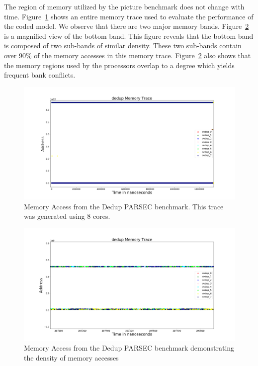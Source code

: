 The region of memory utilized by the picture benchmark does not change with time. Figure~\ref{fig:dedup_whole} shows an entire memory trace used to evaluate the performance of the coded model. We observe that there are two major memory bands. Figure~\ref{fig:dedup_dense} is a magnified view of the bottom band. This figure reveals that the bottom band is composed of two sub-bands of similar density. These two sub-bands contain over 90\% of the memory accesses in this memory trace. Figure~\ref{fig:dedup_dense} also shows that the memory regions used by the processors overlap to a degree which yields frequent bank conflicts.

\begin{figure}[h!]

		\includegraphics[width=\linewidth]{figures/dedup_whole.png}
		\caption{Memory Access from the Dedup PARSEC benchmark. This trace was generated using 8 cores.}
		\label{fig:dedup_whole}
\end{figure}

\begin{figure}[h!]
		\includegraphics[width=\linewidth]{figures/dedup_dense.png}
		\caption{Memory Access from the Dedup PARSEC benchmark demonstrating the density of memory accesses}
		\label{fig:dedup_dense}
\end{figure}
		

